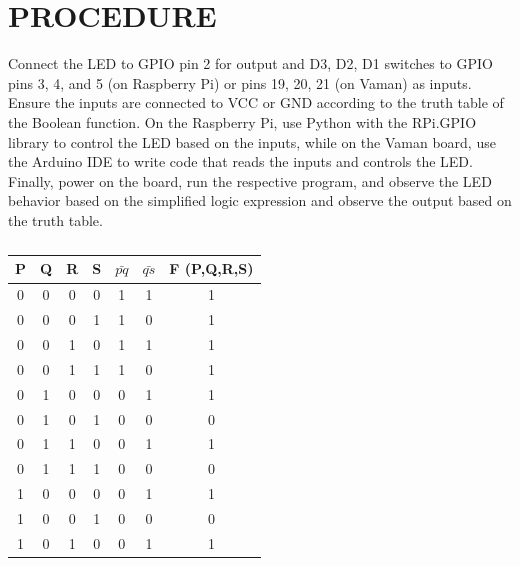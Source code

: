 \documentclass[conference]{IEEEtran}
\begin{document}
\section{PROCEDURE}
 Connect the LED to GPIO pin 2 for output and D3, D2, D1 switches to GPIO pins 3, 4, and 5 (on Raspberry Pi) or pins 19, 20, 21 (on Vaman) as inputs. Ensure the inputs are connected to VCC or GND according to the truth table of the Boolean function. On the Raspberry Pi, use Python with the RPi.GPIO library to control the LED based on the inputs, while on the Vaman board, use the Arduino IDE to write code that reads the inputs and controls the LED. Finally, power on the board, run the respective program, and observe the LED behavior based on the simplified logic expression and observe the output based on the truth table.

\begin{table} [htbp]
\centering
\begin{tabular}{| c | c | c | c | c | c | c |} \hline
P & Q & R & S & $\bar{pq}$ & $\bar{qs}$ & F (P,Q,R,S)    \\\hline
0 & 0 & 0 & 0 & 1 & 1 & 1 \\ \hline
0 & 0 & 0 & 1 & 1 & 0 & 1 \\ \hline
0 & 0 & 1 & 0 & 1 & 1 & 1 \\ \hline
0 & 0 & 1 & 1 & 1 & 0 & 1 \\ \hline
0 & 1 & 0 & 0 & 0 & 1 & 1 \\ \hline
0 & 1 & 0 & 1 & 0 & 0 & 0 \\ \hline
0 & 1 & 1 & 0 & 0 & 1 & 1 \\ \hline
0 & 1 & 1 & 1 & 0 & 0 & 0 \\ \hline
1 & 0 & 0 & 0 & 0 & 1 & 1 \\ \hline
1 & 0 & 0 & 1 & 0 & 0 & 0 \\ \hline
1 & 0 & 1 & 0 & 0 & 1 & 1 \\ \hline
\end{tabular}
\vspace{0.2cm}
\caption{\label{tab:widgets}}
\end{table}
\end{document}
